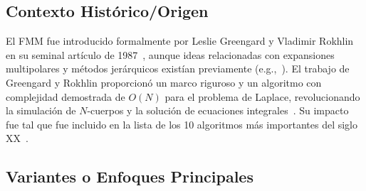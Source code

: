 \subsection{Contexto Histórico/Origen}

El FMM fue introducido formalmente por Leslie Greengard y Vladimir Rokhlin en su seminal artículo de 1987~\cite{GreengardRokhlin1987}, aunque ideas relacionadas con expansiones multipolares y métodos jerárquicos existían previamente (e.g.,~\cite{Appel1985, BarnesHut1986}). El trabajo de Greengard y Rokhlin proporcionó un marco riguroso y un algoritmo con complejidad demostrada de $O(N)$ para el problema de Laplace, revolucionando la simulación de $N$-cuerpos y la solución de ecuaciones integrales~\cite{GreengardRokhlin1987}. Su impacto fue tal que fue incluido en la lista de los 10 algoritmos más importantes del siglo XX~\cite{Cipra2000}.

\subsection{Variantes o Enfoques Principales}

